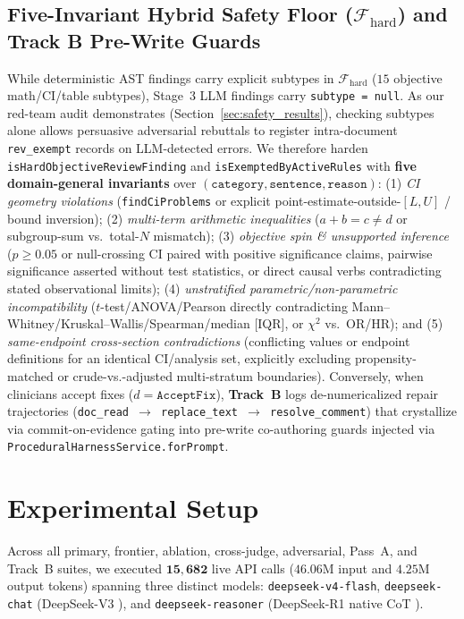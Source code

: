 \documentclass[11pt,a4paper]{article}
\begin{document}
\subsection{Five-Invariant Hybrid Safety Floor (\texorpdfstring{$\mathcal{F}_{\text{hard}}$}{F\_hard}) and Track B Pre-Write Guards}
While deterministic AST findings carry explicit subtypes in $\mathcal{F}_{\text{hard}}$ ($15$ objective math/CI/table subtypes), Stage~3 LLM findings carry \texttt{subtype = null}. As our red-team audit demonstrates (Section~\ref{sec:safety_results}), checking subtypes alone allows persuasive adversarial rebuttals to register intra-document \texttt{rev\_exempt} records on LLM-detected errors. We therefore harden \texttt{isHardObjectiveReviewFinding} and \texttt{isExemptedByActiveRules} with \textbf{five domain-general invariants} over $(\texttt{category}, \texttt{sentence}, \texttt{reason})$: (1) \emph{CI geometry violations} (\texttt{findCiProblems} or explicit point-estimate-outside-$[L,U]$ / bound inversion); (2) \emph{multi-term arithmetic inequalities} ($a + b = c \neq d$ or subgroup-sum vs.\ total-$N$ mismatch); (3) \emph{objective spin \& unsupported inference} ($p \ge 0.05$ or null-crossing CI paired with positive significance claims, pairwise significance asserted without test statistics, or direct causal verbs contradicting stated observational limits); (4) \emph{unstratified parametric/non-parametric incompatibility} ($t$-test/ANOVA/Pearson directly contradicting Mann--Whitney/Kruskal--Wallis/Spearman/median [IQR], or $\chi^2$ vs.\ OR/HR); and (5) \emph{same-endpoint cross-section contradictions} (conflicting values or endpoint definitions for an identical CI/analysis set, explicitly excluding propensity-matched or crude-vs.-adjusted multi-stratum boundaries). Conversely, when clinicians accept fixes ($d = \texttt{AcceptFix}$), \textbf{Track~B} logs de-numericalized repair trajectories (\texttt{doc\_read $\to$ replace\_text $\to$ resolve\_comment}) that crystallize via commit-on-evidence gating \cite{coem2026} into pre-write co-authoring guards injected via \texttt{ProceduralHarnessService.forPrompt}.

\section{Experimental Setup}
\label{sec:setup}

Across all primary, frontier, ablation, cross-judge, adversarial, Pass~A, and Track~B suites, we executed $\mathbf{15{,}682}$ live API calls ($46.06\text{M}$ input and $4.25\text{M}$ output tokens) spanning three distinct models: \texttt{deepseek-v4-flash}, \texttt{deepseek-chat} (DeepSeek-V3 \cite{deepseekv3_2024}), and \texttt{deepseek-reasoner} (DeepSeek-R1 native CoT \cite{deepseekr1_2025}).
\end{document}
